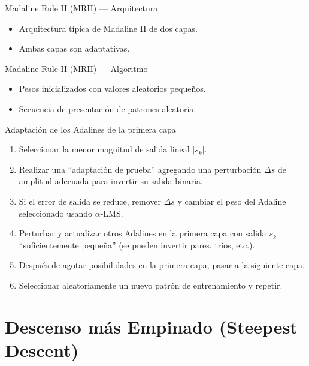 \documentclass[aspectratio=169,utf8,spanish]{beamer}
\begin{document}
\begin{frame}{Madaline Rule II (MRII) — Arquitectura}
  \begin{itemize}
    \item Arquitectura típica de Madaline II de dos capas.
    \item Ambas capas son adaptativas.
  \end{itemize}
\end{frame}

\begin{frame}{Madaline Rule II (MRII) — Algoritmo}
  \begin{itemize}
    \item Pesos inicializados con valores aleatorios pequeños.
    \item Secuencia de presentación de patrones aleatoria.
  \end{itemize}

  \begin{block}{Adaptación de los Adalines de la primera capa}
    \begin{enumerate}
      \item Seleccionar la menor magnitud de salida lineal $|s_k|$.
      \item Realizar una ``adaptación de prueba'' agregando una perturbación $\Delta s$ de amplitud adecuada para invertir su salida binaria.
      \item Si el error de salida se reduce, remover $\Delta s$ y cambiar el peso del Adaline seleccionado usando $\alpha$-LMS.
      \item Perturbar y actualizar otros Adalines en la primera capa con salida $s_k$ ``suficientemente pequeña'' (se pueden invertir pares, tríos, etc.).
      \item Después de agotar posibilidades en la primera capa, pasar a la siguiente capa.
      \item Seleccionar aleatoriamente un nuevo patrón de entrenamiento y repetir.
    \end{enumerate}
  \end{block}
\end{frame}

\section{Descenso más Empinado (Steepest Descent)}
\end{document}
